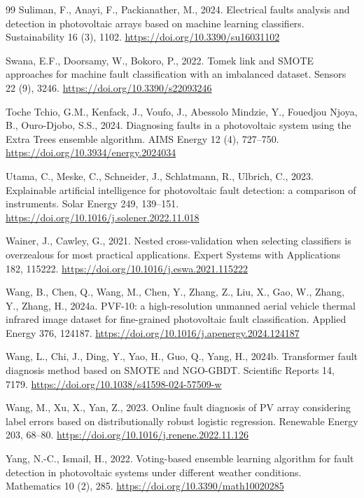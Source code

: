 \documentclass[11pt,a4paper]{article}
\begin{document}
\begin{thebibliography}{99}
Suliman, F., Anayi, F., Packianather, M., 2024. Electrical faults analysis and detection in photovoltaic arrays based on machine learning classifiers. Sustainability 16 (3), 1102. \url{https://doi.org/10.3390/su16031102}

Swana, E.F., Doorsamy, W., Bokoro, P., 2022. Tomek link and SMOTE approaches for machine fault classification with an imbalanced dataset. Sensors 22 (9), 3246. \url{https://doi.org/10.3390/s22093246}

Toche Tchio, G.M., Kenfack, J., Voufo, J., Abessolo Mindzie, Y., Fouedjou Njoya, B., Ouro-Djobo, S.S., 2024. Diagnosing faults in a photovoltaic system using the Extra Trees ensemble algorithm. AIMS Energy 12 (4), 727--750. \url{https://doi.org/10.3934/energy.2024034}

Utama, C., Meske, C., Schneider, J., Schlatmann, R., Ulbrich, C., 2023. Explainable artificial intelligence for photovoltaic fault detection: a comparison of instruments. Solar Energy 249, 139--151. \url{https://doi.org/10.1016/j.solener.2022.11.018}

Wainer, J., Cawley, G., 2021. Nested cross-validation when selecting classifiers is overzealous for most practical applications. Expert Systems with Applications 182, 115222. \url{https://doi.org/10.1016/j.eswa.2021.115222}

Wang, B., Chen, Q., Wang, M., Chen, Y., Zhang, Z., Liu, X., Gao, W., Zhang, Y., Zhang, H., 2024a. PVF-10: a high-resolution unmanned aerial vehicle thermal infrared image dataset for fine-grained photovoltaic fault classification. Applied Energy 376, 124187. \url{https://doi.org/10.1016/j.apenergy.2024.124187}

Wang, L., Chi, J., Ding, Y., Yao, H., Guo, Q., Yang, H., 2024b. Transformer fault diagnosis method based on SMOTE and NGO-GBDT. Scientific Reports 14, 7179. \url{https://doi.org/10.1038/s41598-024-57509-w}

Wang, M., Xu, X., Yan, Z., 2023. Online fault diagnosis of PV array considering label errors based on distributionally robust logistic regression. Renewable Energy 203, 68--80. \url{https://doi.org/10.1016/j.renene.2022.11.126}

Yang, N.-C., Ismail, H., 2022. Voting-based ensemble learning algorithm for fault detection in photovoltaic systems under different weather conditions. Mathematics 10 (2), 285. \url{https://doi.org/10.3390/math10020285}

\end{thebibliography}
\end{document}
